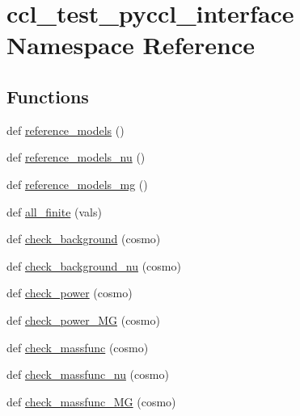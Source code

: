 \hypertarget{namespaceccl__test__pyccl__interface}{}\section{ccl\+\_\+test\+\_\+pyccl\+\_\+interface Namespace Reference}
\label{namespaceccl__test__pyccl__interface}
\subsection*{Functions}
\begin{DoxyCompactItemize}
\item 
def \mbox{\hyperlink{namespaceccl__test__pyccl__interface_af12cc81b73f2b986dbddf49f0b57759a}{reference\+\_\+models}} ()
\item 
def \mbox{\hyperlink{namespaceccl__test__pyccl__interface_a2d1bcf258dbc29d3e39ce74e3dff711e}{reference\+\_\+models\+\_\+nu}} ()
\item 
def \mbox{\hyperlink{namespaceccl__test__pyccl__interface_a0fa0a0827887914d36a7e277eb03589d}{reference\+\_\+models\+\_\+mg}} ()
\item 
def \mbox{\hyperlink{namespaceccl__test__pyccl__interface_aecd07d8c3c95bccf7dad21e068684ad0}{all\+\_\+finite}} (vals)
\item 
def \mbox{\hyperlink{namespaceccl__test__pyccl__interface_abeb0e16edb05cf5ed17fd43254ea2d4b}{check\+\_\+background}} (cosmo)
\item 
def \mbox{\hyperlink{namespaceccl__test__pyccl__interface_afd5e77929d503c6eaed00a8a0975c13a}{check\+\_\+background\+\_\+nu}} (cosmo)
\item 
def \mbox{\hyperlink{namespaceccl__test__pyccl__interface_a0e14d8cd4b51c38207fa38e5ca127e38}{check\+\_\+power}} (cosmo)
\item 
def \mbox{\hyperlink{namespaceccl__test__pyccl__interface_a7d06b60d91970b9d503c60804f42b1e0}{check\+\_\+power\+\_\+\+MG}} (cosmo)
\item 
def \mbox{\hyperlink{namespaceccl__test__pyccl__interface_af18b1262baf153cf44e7cd4fe4ebf02f}{check\+\_\+massfunc}} (cosmo)
\item 
def \mbox{\hyperlink{namespaceccl__test__pyccl__interface_ade98af8ec8a8309c2012c63e9a3766ae}{check\+\_\+massfunc\+\_\+nu}} (cosmo)
\item 
def \mbox{\hyperlink{namespaceccl__test__pyccl__interface_a694d4068ccc8aba45f1fdf9772bf89cd}{check\+\_\+massfunc\+\_\+\+MG}} (cosmo)
\item 

\end{DoxyCompactItemize}
